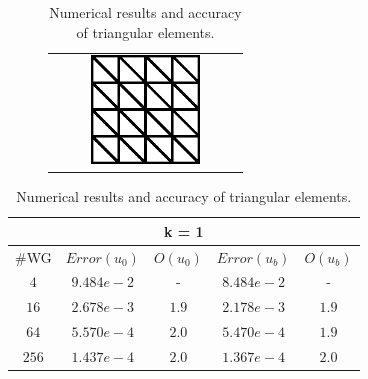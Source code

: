 						
						\vspace{5mm}
						\begin{table}[H]
							\small
							\vspace{-10pt}
							
							\setlength{\tabcolsep}{1pt} {
								\vspace{-5pt}
								\begin{center}
									\begin{minipage}{0.4\textwidth}
										\begin{figure}[H]
											\centering
											\begin{tabular}{c}
												\includegraphics[width=0.6\textwidth]{./pics/triangleMesh}
											\end{tabular}
										\end{figure}
									\end{minipage}
									\begin{minipage}{0.5\textwidth}
										\begin{tabular}{c|c|c|c|c}
											\hline
											\multicolumn{5}{c}{ k = 1} \\
											\hline
											\#WG & $ Error (u_{0}) $ & $ O(u_{0}) $ & $ Error(u_{b})  $& $ O(u_{b})  $\\
											\hline
											$ 4 $ & $ 9.484e-2 $ & - & $ 8.484e-2 $ & - \\
											\hline
											$ 16 $ & $ 2.678e-3 $ & $ 1.9 $& $ 2.178e-3 $ & $ 1.9 $ \\
											\hline
											$ 64 $ & $ 5.570e-4 $ & $ 2.0 $ & $ 5.470e-4 $ & $ 1.9 $ \\
											\hline
											$ 256 $ & $ 1.437e-4 $ & $ 2.0 $ & $ 1.367e-4 $ & $ 2.0 $\\
											\hline
										\end{tabular}
									\end{minipage}
									
								\end{center} }
								\caption{Numerical results and accuracy of triangular elements.}
								\label{Tab: triangleMesh}
							\end{table}
							
